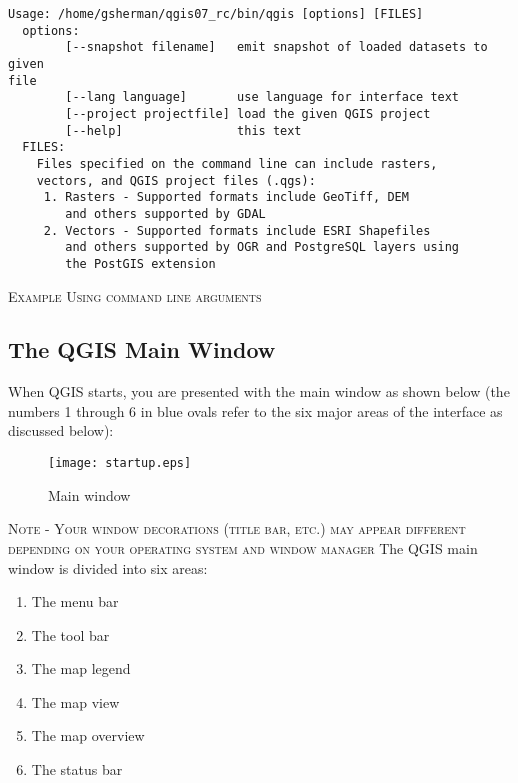 \small
\begin{verbatim}
Usage: /home/gsherman/qgis07_rc/bin/qgis [options] [FILES]
  options:
        [--snapshot filename]   emit snapshot of loaded datasets to given
file
        [--lang language]       use language for interface text
        [--project projectfile] load the given QGIS project
        [--help]                this text
  FILES:
    Files specified on the command line can include rasters,
    vectors, and QGIS project files (.qgs):
     1. Rasters - Supported formats include GeoTiff, DEM
        and others supported by GDAL
     2. Vectors - Supported formats include ESRI Shapefiles
        and others supported by OGR and PostgreSQL layers using
        the PostGIS extension

\end{verbatim}
\normalsize

\begin{Tip} \caption{\textsc{Example Using command line arguments}}
\end{Tip}

\subsection{The QGIS Main Window}
\label{label_qgismainwindow}

When QGIS starts, you are presented with the main window as shown below
(the numbers 1 through 6 in blue ovals refer to the six major areas of the
interface as discussed below):

\begin{figure}[ht]
   \begin{center}
   \caption{Main window}\label{fig:startup}
   \texttt{[image: startup.eps]}
\end{center} 
\end{figure}

\textsc{Note - Your window decorations (title bar, etc.) may appear
different depending on your operating system and window manager}
The QGIS main window is divided into six areas:

\begin{enumerate}
\item The menu bar
\item The tool bar
\item The map legend
\item The map view
\item The map overview
\item The status bar
\end{enumerate}

